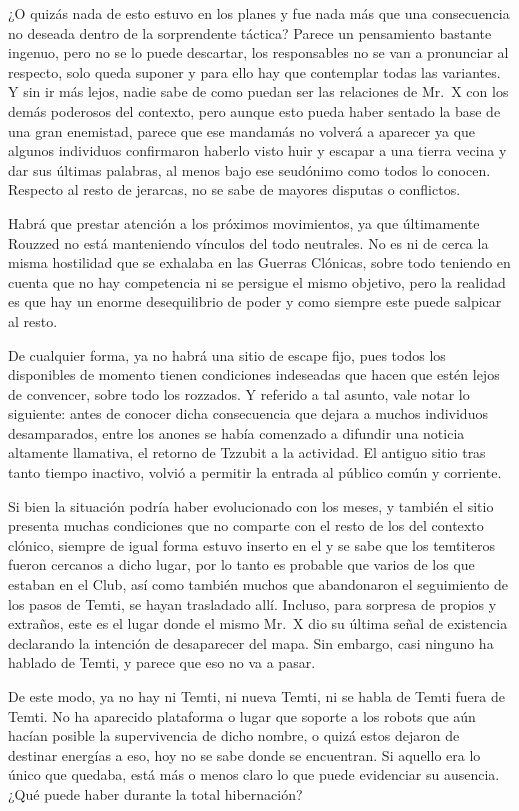\documentclass[
  spanish,
]{book}
\begin{document}
¿O quizás nada de esto estuvo en los planes y fue nada más que una consecuencia no deseada dentro de la sorprendente táctica? Parece un pensamiento bastante ingenuo, pero no se lo puede descartar, los responsables no se van a pronunciar al respecto, solo queda suponer y para ello hay que contemplar todas las variantes. Y sin ir más lejos, nadie sabe de como puedan ser las relaciones de Mr.~X con los demás poderosos del contexto, pero aunque esto pueda haber sentado la base de una gran enemistad, parece que ese mandamás no volverá a aparecer ya que algunos individuos confirmaron haberlo visto huir y escapar a una tierra vecina y dar sus últimas palabras, al menos bajo ese seudónimo como todos lo conocen. Respecto al resto de jerarcas, no se sabe de mayores disputas o conflictos.

Habrá que prestar atención a los próximos movimientos, ya que últimamente Rouzzed no está manteniendo vínculos del todo neutrales. No es ni de cerca la misma hostilidad que se exhalaba en las Guerras Clónicas, sobre todo teniendo en cuenta que no hay competencia ni se persigue el mismo objetivo, pero la realidad es que hay un enorme desequilibrio de poder y como siempre este puede salpicar al resto.

De cualquier forma, ya no habrá una sitio de escape fijo, pues todos los disponibles de momento tienen condiciones indeseadas que hacen que estén lejos de convencer, sobre todo los rozzados. Y referido a tal asunto, vale notar lo siguiente: antes de conocer dicha consecuencia que dejara a muchos individuos desamparados, entre los anones se había comenzado a difundir una noticia altamente llamativa, el retorno de Tzzubit a la actividad. El antiguo sitio tras tanto tiempo inactivo, volvió a permitir la entrada al público común y corriente.

Si bien la situación podría haber evolucionado con los meses, y también el sitio presenta muchas condiciones que no comparte con el resto de los del contexto clónico, siempre de igual forma estuvo inserto en el y se sabe que los temtiteros fueron cercanos a dicho lugar, por lo tanto es probable que varios de los que estaban en el Club, así como también muchos que abandonaron el seguimiento de los pasos de Temti, se hayan trasladado allí. Incluso, para sorpresa de propios y extraños, este es el lugar donde el mismo Mr.~X dio su última señal de existencia declarando la intención de desaparecer del mapa. Sin embargo, casi ninguno ha hablado de Temti, y parece que eso no va a pasar.

De este modo, ya no hay ni Temti, ni nueva Temti, ni se habla de Temti fuera de Temti. No ha aparecido plataforma o lugar que soporte a los robots que aún hacían posible la supervivencia de dicho nombre, o quizá estos dejaron de destinar energías a eso, hoy no se sabe donde se encuentran. Si aquello era lo único que quedaba, está más o menos claro lo que puede evidenciar su ausencia. ¿Qué puede haber durante la total hibernación?
\end{document}
